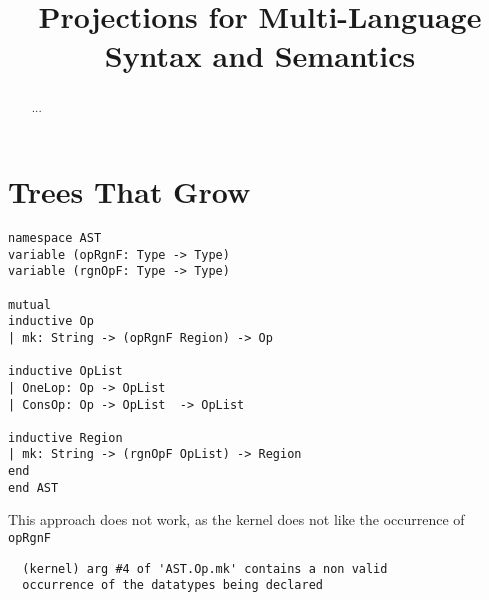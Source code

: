 \documentclass[sigconf]{acmart}
\begin{document}
\title{Projections for Multi-Language Syntax and Semantics}

\begin{abstract}
...
\end{abstract}



\maketitle


\section{Trees That Grow}

\begin{verbatim}
namespace AST
variable (opRgnF: Type -> Type)
variable (rgnOpF: Type -> Type)

mutual
inductive Op
| mk: String -> (opRgnF Region) -> Op

inductive OpList
| OneLop: Op -> OpList
| ConsOp: Op -> OpList  -> OpList

inductive Region
| mk: String -> (rgnOpF OpList) -> Region
end
end AST
\end{verbatim}

This approach does not work, as the kernel does not
like the occurrence of \texttt{opRgnF}

\begin{verbatim}
  (kernel) arg #4 of 'AST.Op.mk' contains a non valid
  occurrence of the datatypes being declared
\end{verbatim}

\


\end{document}
